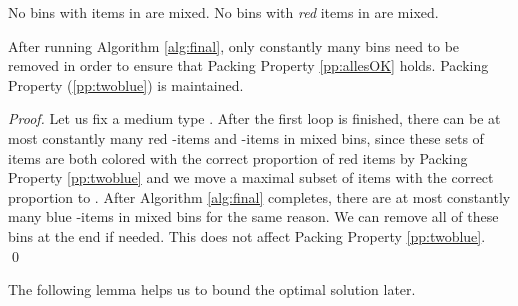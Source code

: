 \begin{pproperty}
\label{pp:allesOK}
No bins with items in  are mixed. 
No bins with \emph{red} items in  are mixed.
\end{pproperty}

\begin{lemma}
	\label{lem:pp12}
	After running Algorithm \ref{alg:final}, only constantly many bins need to be removed in order to ensure that Packing Property \ref{pp:allesOK} holds.
	Packing Property (\ref{pp:twoblue}) is maintained.
\end{lemma}

\begin{proof}
Let us fix a medium type .
After the first loop is finished, there can be at most constantly many red -items and -items in mixed bins, 
since these sets of items are both colored with the correct proportion of
red items by Packing Property \ref{pp:twoblue} and we move a maximal subset of items with the correct proportion to . 
After Algorithm \ref{alg:final} completes, there are at most constantly many blue -items in mixed bins
for the same reason.
We can remove all of these bins at the end if needed. This does not affect Packing Property \ref{pp:twoblue}.
\qed\end{proof}

The following lemma helps us to bound the optimal solution later.

